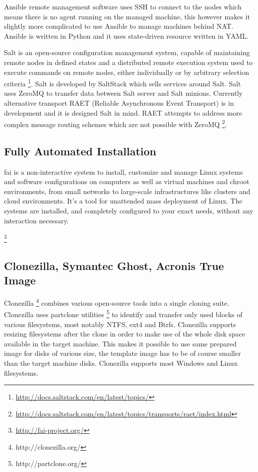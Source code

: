 \documentclass[a4paper,11pt]{kth-mag}
\begin{document}
Ansible remote management software uses SSH to connect to the nodes which
means there is no agent running on the managed machine, this however makes
it slightly more complicated to use Ansible to manage machines behind NAT.
Ansible is written in Python and it uses state-driven resource 
written in YAML.

Salt is an open-source configuration management system,
capable of maintaining remote nodes in defined states and 
a distributed remote execution system used to execute commands
on remote nodes, either individually or by arbitrary selection criteria
\footnote{\url{http://docs.saltstack.com/en/latest/topics/}}.
Salt is developed by SaltStack which sells services around Salt.
Salt uses ZeroMQ to transfer data between Salt server and
Salt minions.
Currently alternative transport
RAET (Reliable Asynchronous Event Transport)
is in development and it is designed Salt in mind.
RAET attempts to address more complex message routing
schemes which are not possible with ZeroMQ
\footnote{\url{http://docs.saltstack.com/en/latest/topics/transports/raet/index.html}}.


\subsection{Fully Automated Installation}


\gls{fai} is a non-interactive system to install, customize and manage
Linux systems and software configurations on computers as well as
virtual machines and chroot environments, from small networks to
large-scale infrastructures like clusters and cloud environments.
It's a tool for unattended mass deployment of Linux. The systems
are installed, and completely configured to your exact needs,
without any interaction necessary. 




\footnote{\url{http://fai-project.org/}}

\subsection{Clonezilla, Symantec Ghost, Acronis True Image}

Clonezilla \footnote{http://clonezilla.org/}
combines various open-source tools into a single cloning suite.
Clonezilla uses partclone utilities \footnote{http://partclone.org/} to
identify and transfer only used blocks of various filesystems, most notably
NTFS, ext4 and Btrfs.
Clonezilla supports resizing filesystems after the clone
in order to make use of the whole disk space available
in the target machine.
This makes it possible to use same prepared image for disks of
various size, the template image has to be of course smaller
than the target machine disks.
Clonezilla supports most Windows and Linux filesystems.
\end{document}
